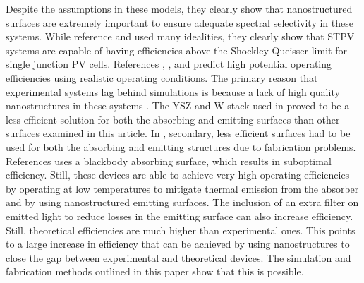 \documentclass[review]{elsarticle}
\begin{document}
Despite the assumptions in these models, they clearly show that nanostructured surfaces are extremely important to ensure adequate spectral selectivity in these systems.  While reference \cite{RF_OptExp_2009} and \cite{global_opt} used many idealities, they clearly show that STPV systems are capable of having efficiencies above the Shockley-Queisser limit for single junction PV cells.  References \cite{paper2_ref6}, \cite{me_thesis}, and \cite{NYL_SEMSC_2014} predict high potential operating efficiencies using realistic operating conditions.  The primary reason that experimental systems lag behind simulations is because a lack of high quality nanostructures in these systems \cite{SKY_JPE_2015,me3}.  The YSZ and W stack used in \cite{SKY_JPE_2015} proved to be a less efficient solution for both the absorbing and emitting surfaces than other surfaces examined in this article.  In \cite{me3}, secondary, less efficient surfaces had to be used for both the absorbing and emitting structures due to fabrication problems. References \cite{SKY_JPE_2015,MIT_paper,nnnNature} uses a blackbody absorbing surface, which results in suboptimal efficiency.  Still, these devices are able to achieve very high operating efficiencies by operating at low temperatures to mitigate thermal emission from the absorber and by using nanostructured emitting surfaces.  The inclusion of an extra filter on emitted light to reduce losses in the emitting surface can also increase efficiency\cite{nnnNature}.  Still, theoretical efficiencies are much higher than experimental ones. This points to a large increase in efficiency that can be achieved by using nanostructures to close the gap between experimental and theoretical devices.  The simulation and fabrication methods outlined in this paper show that this is possible.
\end{document}
